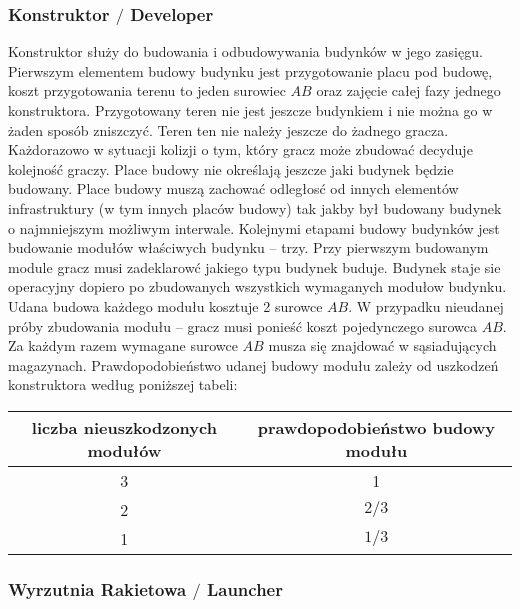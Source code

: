 \documentclass[11pt,a4paper]{article}
\begin{document}
\subsubsection{Konstruktor $/$ Developer}

Konstruktor służy do budowania i odbudowywania budynków w jego zasięgu. Pierwszym elementem budowy budynku jest przygotowanie placu pod budowę, koszt przygotowania terenu to jeden surowiec $AB$ oraz zajęcie całej fazy jednego konstruktora. Przygotowany teren nie jest jeszcze budynkiem i nie można go w żaden sposób zniszczyć. Teren ten nie należy jeszcze do żadnego gracza. Każdorazowo w sytuacji kolizji o tym, który gracz może zbudować decyduje kolejność graczy. Place budowy nie określają jeszcze jaki budynek będzie budowany. Place budowy muszą zachować odległosć od innych elementów infrastruktury (w tym innych placów budowy) tak jakby był budowany budynek o najmniejszym możliwym interwale. Kolejnymi etapami budowy budynków jest budowanie modułów właściwych budynku -- trzy. Przy pierwszym budowanym module gracz musi zadeklarowć jakiego typu budynek buduje. Budynek staje sie operacyjny dopiero po zbudowanych wszystkich wymaganych modułow budynku. Udana budowa każdego modułu kosztuje 2 surowce $AB$. W przypadku nieudanej próby zbudowania modułu -- gracz musi ponieść koszt pojedynczego surowca $AB$. Za każdym razem wymagane surowce $AB$ musza się znajdować w sąsiadujących magazynach. Prawdopodobieństwo udanej budowy modułu zależy od uszkodzeń konstruktora według poniższej tabeli:
\begin{center}
  \begin{tabular}{| c | c |}
    \hline
    \textbf{liczba nieuszkodzonych modułów} & \textbf{prawdopodobieństwo budowy modułu}\\
    \hline
     3 & 1 \\
    \hline
    2 & $2/3$ \\
    \hline
    1 & $1/3$ \\
    \hline
  \end{tabular}
\end{center}


\subsubsection{Wyrzutnia Rakietowa $/$ Launcher}
\end{document}
